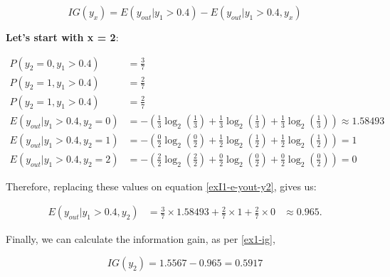 \documentclass[12pt]{article}
\begin{document}
\begin{enumerate}[leftmargin=\labelsep]
    \begin{equation}\label{ex1-ig}
        IG(y_x) = E(y_{out} |y_1 > 0.4) - E(y_{out} |y_1 > 0.4, y_x)
    \end{equation}

    \textbf{Let's start with x = 2}:

    \[
        \begin{aligned}
            P(y_2 = 0, y_1 > 0.4)          & = \frac{3}{7}                                                                                       \\
            P(y_2 = 1, y_1 > 0.4)          & = \frac{2}{7}                                                                                       \\
            P(y_2 = 1, y_1 > 0.4)          & = \frac{2}{7}                                                                                       \\
            E(y_{out} | y_1 > 0.4 , y_2 = 0) & = - \left(\frac{1}{3} \log_2\left(\frac{1}{3}\right) + \frac{1}{3} \log_2\left(\frac{1}{3}\right)
                + \frac{1}{3} \log_2\left(\frac{1}{3}\right)\right) \approx 1.58493                                                              \\
            E(y_{out} | y_1 > 0.4 , y_2 = 1) & = - \left(\frac{0}{2} \log_2\left(\frac{0}{2}\right) + \frac{1}{2} \log_2\left(\frac{1}{2}\right)
                + \frac{1}{2} \log_2\left(\frac{1}{2}\right)\right) = 1                                                                          \\
            E(y_{out} | y_1 > 0.4 , y_2 = 2) & = - \left(\frac{2}{2} \log_2\left(\frac{2}{2}\right) + \frac{0}{2} \log_2\left(\frac{0}{2}\right)
                + \frac{0}{2} \log_2\left(\frac{0}{2}\right)\right) = 0
        \end{aligned}
    \]

    Therefore, replacing these values on equation \eqref{exI1-e-yout-y2}, gives us:

    \[
        \begin{aligned}
            E(y_{out} | y_1>0.4, y_2) & = \frac{3}{7} \times 1.58493 + \frac{2}{7} \times 1 + \frac{2}{7} \times 0 & \approx 0.965.
        \end{aligned}
    \]

    Finally, we can calculate the information gain, as per \eqref{ex1-ig},

    \[
        IG(y_{2}) = 1.5567 - 0.965 = 0.5917
    \]


\end{enumerate}
\end{document}
